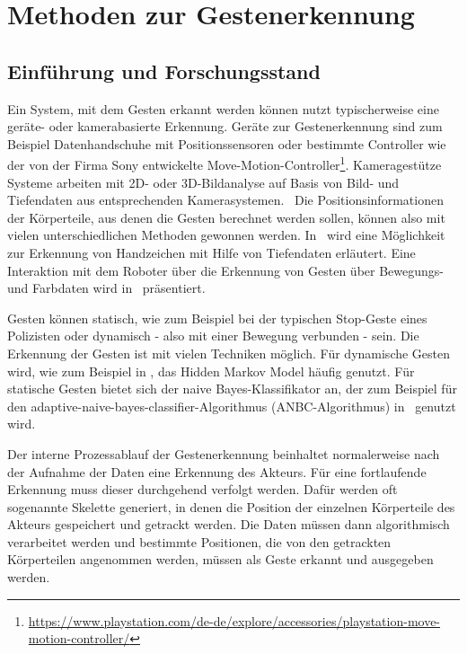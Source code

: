 \chapter{Methoden zur Gestenerkennung} \label{Gestenerkennungskapitel}

\section{Einführung und Forschungsstand}
Ein System, mit dem Gesten erkannt werden können nutzt typischerweise eine geräte- oder kamerabasierte Erkennung. Geräte zur Gestenerkennung sind zum Beispiel Datenhandschuhe mit Positionssensoren oder bestimmte Controller wie der von der Firma Sony entwickelte Move-Motion-Controller\footnote{\url{https://www.playstation.com/de-de/explore/accessories/playstation-move-motion-controller/}}. Kameragestütze Systeme arbeiten mit 2D- oder 3D-Bildanalyse auf Basis von Bild- und Tiefendaten aus entsprechenden Kamerasystemen.~\cite{recognitionSurvey} Die Positionsinformationen der Körperteile, aus denen die Gesten berechnet werden sollen, können also mit vielen unterschiedlichen Methoden gewonnen werden. In~\cite{depthRecognition} wird eine Möglichkeit zur Erkennung von Handzeichen mit Hilfe von Tiefendaten erläutert. Eine Interaktion mit dem Roboter über die Erkennung von Gesten über Bewegungs- und Farbdaten wird in~\cite{colorRecognition} präsentiert. 

Gesten können statisch, wie zum Beispiel bei der typischen Stop-Geste eines Polizisten oder dynamisch - also mit einer Bewegung verbunden - sein. Die Erkennung der Gesten ist mit vielen Techniken möglich. Für dynamische Gesten wird, wie zum Beispiel in \cite{hiddenMarkov}, das Hidden Markov Model häufig genutzt. Für statische Gesten bietet sich der naive Bayes-Klassifikator an, der zum Beispiel für den adaptive-naive-bayes-classifier-Algorithmus (ANBC-Algorithmus) in~\cite{gillianANBC} genutzt wird.

Der interne Prozessablauf der Gestenerkennung beinhaltet normalerweise nach der Aufnahme der Daten eine Erkennung des Akteurs. Für eine fortlaufende Erkennung muss dieser durchgehend verfolgt werden. Dafür werden oft sogenannte Skelette generiert, in denen die Position der einzelnen Körperteile des Akteurs gespeichert und getrackt werden. Die Daten müssen dann algorithmisch verarbeitet werden und bestimmte Positionen, die von den getrackten Körperteilen angenommen werden, müssen als Geste erkannt und ausgegeben werden.

